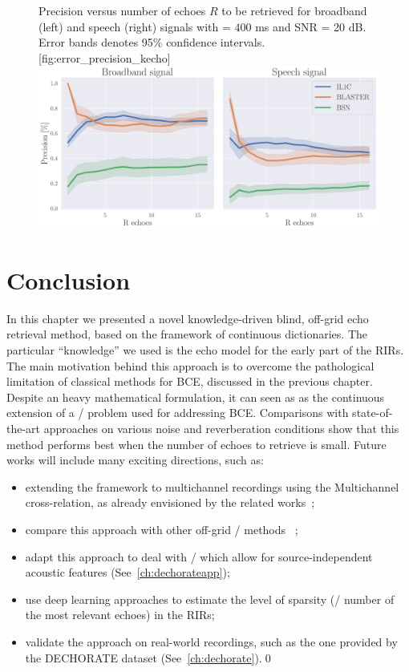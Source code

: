 \begin{figure}[t!]
    \begin{sidecaption}[]{
        Precision versus number of echoes $R$ to be retrieved for broadband (left) and speech (right) signals with \RT{} = $400$ ms and SNR = 20 dB.
        Error bands denotes 95\% confidence intervals.
    }[fig:error_precision_kecho]
    \centering
    \includegraphics[width=\linewidth]{figures/blaster/p_k-7_thr-2_bns_crocco_blaster-peak_withRechoes.pdf}
    \end{sidecaption}
\end{figure}

\section{Conclusion}
In this chapter we presented a novel knowledge-driven blind, off-grid echo retrieval method, based on the framework of continuous dictionaries.
The particular ``knowledge'' we used is the echo model for the early part of the \acp{RIR}.
The main motivation behind this approach is to overcome the pathological limitation of classical methods for \ac{BCE}, discussed in the previous chapter.
Despite an heavy mathematical formulation, it can seen as as the continuous extension of a \LASSO/ problem used for addressing \ac{BCE}.
Comparisons with state-of-the-art approaches on various noise and reverberation conditions show that this method performs best when the number of echoes to retrieve is small.
Future works will include many exciting directions, such as:
\begin{itemize}
    \item extending the framework to multichannel recordings using the Multichannel cross-relation, as already envisioned by the related works~;
    \item compare this approach with other off-grid \AER/ methods  ~;
    \item adapt this approach to deal with \ReTF/ which allow for source-independent acoustic features (See~\cref{ch:dechorateapp});
    \item use deep learning approaches to estimate the level of sparsity (\aka/ number of the most relevant echoes) in the \acp{RIR};
    \item validate the approach on real-world recordings, such as the one provided by the \ac{DECHORATE} dataset (See~\cref{ch:dechorate}).\qed
\end{itemize}